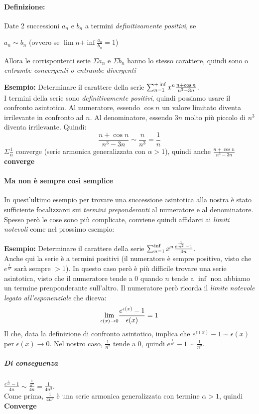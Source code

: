 \documentclass[12pt, a4paper, openany]{book}
\newcommand{\esempio}[1]{\begin{box_esempio} \textbf{Esempio: }#1\end{box_esempio}}
\begin{document}
\paragraph*{Definizione:} Date 2 successioni $a_n$ e $b_n$ a termini \emph{definitivamente positivi}, se 
\begin{center}
    $a_n \sim b_n$ (ovvero se $\lim{n}{+\inf} \frac{a_n}{b_n} = 1$)
\end{center}
Allora le corrispontenti serie $\Sigma a_n$ e $\Sigma b_n$ hanno lo stesso carattere, quindi sono o \emph{entrambe convergenti o entrambe divergenti}
\esempio{
    Determinare il carattere della serie $\sum_{n=1}^{+\inf} x^n \frac{n+ \cos n}{n^3 - 3n}$.\\
    I termini della serie sono \emph{definitivamente positivi}, quindi possiamo usare il confronto asintotico.
    Al numeratore, essendo $\cos n$ un valore limitato diventa irrilevante in confronto ad $n$.
    Al denominatore, essendo $3n$ molto più piccolo di $n^3$ diventa irrilevante. 
    Quindi:
    \begin{equation*}
        \frac{n+\cos n}{n^3 - 3n} \sim \frac{n}{n^3} = \frac{1}{n}
    \end{equation*}
    $\Sigma \frac{1}{n}$ converge (serie armonica generalizzata con $\alpha > 1$), quindi anche $\frac{n+\cos n}{n^3 - 3n}$ \textbf{converge}
}
\paragraph{Ma non è sempre così semplice}In quest'ultimo esempio per trovare una successione asintotica alla nostra è stato sufficiente focalizzarci sui \emph{termini preponderanti} al numeratore e al denominatore.
Spesso però le cose sono più complicate, conviene quindi affidarci ai \emph{limiti notevoli} come nel prossimo esempio:
\esempio{
    Determinare il carattere della serie $\sum_{n=1}^{\inf} x^n \frac{e^{\frac{1}{n^2}} -1}{4n}$.\\
    Anche qui la serie è a termini positivi (il numeratore è sempre positivo, visto che $e^\frac{1}{n^2}$ sarà sempre $ > 1$).
    In questo caso però è più difficile trovare una serie asintotica, visto che il numeratore tende a 0 quando $n$ tende a $\inf$ non abbiamo un termine prenponderante sull'altro.
    Il numeratore però ricorda il \emph{limite notevole legato all'esponenziale} che diceva:
    \begin{equation}
        \underset{\epsilon(x) \to 0}{\lim} \frac{e^{\epsilon(x)}-1}{\epsilon(x)} = 1
    \end{equation}
    Il che, data la definizione di confronto asintotico, implica che $e^{\epsilon(x)}-1 \sim \epsilon(x)$ per $\epsilon(x) \to 0$.
    Nel nostro caso, $\frac{1}{n^2}$ tende a $0$, quindi $e^{\frac{1}{n^2}} -1 \sim \frac{1}{n^2}$.\\
    \subparagraph*{Di conseguenza} $\frac{e^{\frac{1}{n^2}} -1}{4n} \sim \frac{\frac{1}{n^2}}{4n} = \frac{1}{4n^3}$.\\
    Come prima, $\frac{1}{4n^3}$ è una serie armonica generalizzata con termine $\alpha > 1$, quindi \textbf{Converge}
}
\end{document}
